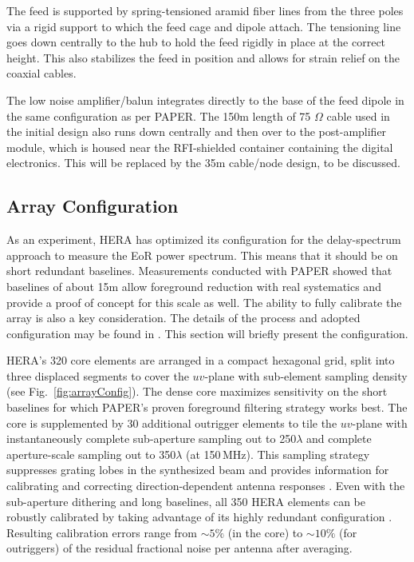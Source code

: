 \documentclass[preprint,11pt]{aastex}
\begin{document}

The feed is supported by spring-tensioned aramid fiber lines from the three poles via a rigid support to which the feed cage and dipole attach.  The tensioning line goes down centrally to the hub to hold the feed rigidly in place at the correct height.  This also stabilizes the feed in position and allows for strain relief on the coaxial cables.  

The low noise amplifier/balun integrates directly to the base of the feed dipole in the same configuration as per PAPER.  The 150m length of 75 $\Omega$ cable used in the initial design also runs down centrally and then over to the post-amplifier module, which is housed near the RFI-shielded container containing the digital electronics.  This will be replaced by the 35m cable/node design, to be discussed.


\subsection{Array Configuration}
\label{sec:arrayConfig}

As an experiment, HERA has optimized its configuration for the delay-spectrum approach to measure the EoR power spectrum.  This means that it should be on short redundant baselines.  Measurements conducted with PAPER showed that baselines of about 15m allow foreground reduction with real systematics and provide a proof of concept for this scale as well.  The ability to fully calibrate the array is also a key consideration.  The details of the process and adopted configuration may be found in \cite{dillon_parsons2016}.  This section will briefly present the configuration.

HERA's 320 core elements are arranged in a compact hexagonal grid, split into three displaced segments 
to cover the $uv$-plane with sub-element sampling density (see Fig.~\ref{fig:arrayConfig}). The dense core maximizes 
sensitivity on the short baselines for which PAPER's proven foreground filtering strategy works best.
The core is supplemented by 30 additional outrigger elements 
to tile the $uv$-plane with instantaneously complete sub-aperture 
sampling out to 250$\lambda$ and complete aperture-scale sampling out to 350$\lambda$ (at 150\,MHz). This sampling 
strategy suppresses grating lobes in the synthesized beam and provides information for calibrating and correcting 
direction-dependent antenna responses \citep{dillon_parsons2016}.
Even with the sub-aperture dithering and long baselines, all 350 HERA elements can be robustly calibrated by taking advantage of 
its highly redundant configuration \citep{liu_et_al2010,zheng_et_al2014}. 
Resulting calibration errors range from $\sim5\%$ (in the core) to $\sim10\%$ (for outriggers)
of the residual fractional noise per antenna after averaging.
\end{document}
